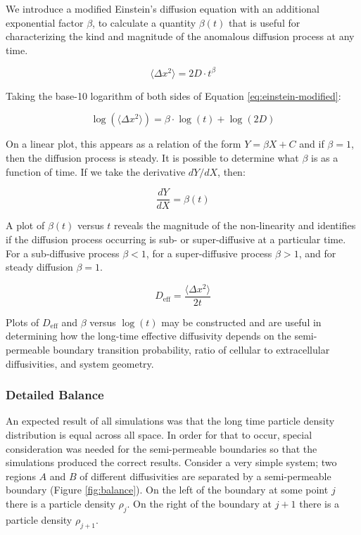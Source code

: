 	
	We introduce a modified Einstein's diffusion equation with an additional exponential factor $ \beta $, to calculate a quantity $ \beta (t) $ that is useful for characterizing the kind and magnitude of the anomalous diffusion process at any time.
	
	\begin{equation}
	\label{eq:einstein-modified}
		\langle \Delta x^2 \rangle = 2D \cdot t^{\beta}
	\end{equation}
	
	Taking the base-10 logarithm of both sides of Equation \ref{eq:einstein-modified}:

	\begin{equation}
		\log\left( \langle \Delta x^2 \rangle \right) = \beta \cdot \log(t) + \log(2D)
	\end{equation}	
	
	On a linear plot, this appears as a relation of the form $ Y = \beta X + C $ and if $ \beta = 1 $, then the diffusion process is steady. It is possible to determine what $ \beta $ is as a function of time. If we take the derivative $ dY/dX $, then:
	
	\begin{equation}
		\dfrac{dY}{dX} = \beta (t)
	\end{equation}
	
	A plot of $ \beta (t) $ versus $ t $ reveals the magnitude of the non-linearity and identifies if the diffusion process occurring is sub- or super-diffusive at a particular time. For a sub-diffusive process $ \beta < 1 $, for a super-diffusive process $ \beta > 1 $, and for steady diffusion $ \beta = 1 $.
	
	\begin{equation}
		D_\textrm{eff} = \dfrac{\langle \Delta x^2 \rangle}{2t}
	\end{equation}
	
	Plots of $ D_\textrm{eff} $ and $ \beta $ versus $ \log (t) $ may be constructed and are useful in determining how the long-time effective diffusivity depends on the semi-permeable boundary transition probability, ratio of cellular to extracellular diffusivities, and system geometry.
	
\subsubsection{Detailed Balance}

	An expected result of all simulations was that the long time particle density distribution is equal across all space. In order for that to occur, special consideration was needed for the semi-permeable boundaries so that the simulations produced the correct results. Consider a very simple system; two regions $ A $ and $ B $ of different diffusivities are separated by a semi-permeable boundary (Figure \ref{fig:balance}). On the left of the boundary at some point $ j $ there is a particle density $ \rho_j $. On the right of the boundary at $ j+1 $ there is a particle density $ \rho_{j+1} $. 
	
